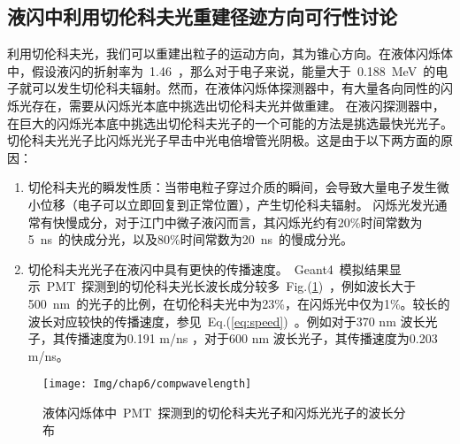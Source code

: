 \subsection{液闪中利用切伦科夫光重建径迹方向可行性讨论}
利用切伦科夫光，我们可以重建出粒子的运动方向，其为锥心方向。在液体闪烁体中，假设液闪的折射率为~1.46~，那么对于电子来说，能量大于~0.188~MeV~的电子就可以发生切伦科夫辐射。然而，在液体闪烁体探测器中，有大量各向同性的闪烁光存在，需要从闪烁光本底中挑选出切伦科夫光并做重建。
在液闪探测器中，在巨大的闪烁光本底中挑选出切伦科夫光子的一个可能的方法是挑选最快光光子。切伦科夫光光子比闪烁光光子早击中光电倍增管光阴极。这是由于以下两方面的原因：
\begin{enumerate}
\item 切伦科夫光的瞬发性质：当带电粒子穿过介质的瞬间，会导致大量电子发生微小位移（电子可以立即回复到正常位置），产生切伦科夫辐射\citep{jelley1955cerenkov}。 闪烁光发光通常有快慢成分，对于江门中微子液闪而言，其闪烁光约有20\%时间常数为5~ns~的快成分光，以及80\%时间常数为20~ns~的慢成分光。
\item 切伦科夫光光子在液闪中具有更快的传播速度。~Geant4~模拟结果显示~PMT~探测到的切伦科夫光长波长成分较多~Fig.(\ref{fig:compwavelength})~，例如波长大于500~nm~的光子的比例，在切伦科夫光中为23\%，在闪烁光中仅为1\%。较长的波长对应较快的传播速度，参见~Eq.(\ref{eq:speed})~。例如对于370 nm 波长光子，其传播速度为0.191 m/ns ，对于600 nm 波长光子，其传播速度为0.203 m/ns。
\end{enumerate}
\begin{figure}[!htbp]
  \centering
   \texttt{[image: Img/chap6/compwavelength]}
    \caption{液体闪烁体中~PMT~探测到的切伦科夫光子和闪烁光光子的波长分布}
  \label{fig:compwavelength}
\end{figure}

